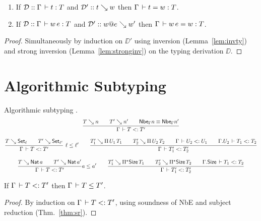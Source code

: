 \documentclass[acmlarge,review,anonymous]{acmart}\settopmatter{printfolios=true}
\begin{document}
\begin{theorem}
  \label{thm:sr}
  \bla
  \begin{enumerate}
  \item
  If\/ $\mathcal{D} :: \Gamma \,\vdash t : T$ and $\mathcal{D}' :: t \searrow w$ then $\Gamma \,\vdash t = w : T$.
  \item
  If\/ $\mathcal{D} :: \Gamma \,\vdash w\, e : T$ and $\mathcal{D}' :: w @ e \searrow w'$ then $\Gamma \,\vdash w\,e = w : T$.
  \end{enumerate}
\end{theorem}
\begin{proof}
  Simultaneously by induction on $\DD'$
  using inversion (Lemma~\ref{lem:invty}) and strong inversion (Lemma~\ref{lem:stronginv})
  on the typing derivation $\DD$. %
\end{proof}

\section{Algorithmic Subtyping}
\label{sec:asub}

Algorithmic subtyping .
\begin{gather*}
  \ru{T \evalsto n \qquad
      T' \evalsto n' \qquad
      \Nbe \Gamma n \equiv \Nbe \Gamma n'
    }{\Gamma \der T \asub T'}
\\[2ex]
  \rux{T \evalsto \Set[\ell] \qquad
      T' \evalsto \Set[\ell']
    }{\Gamma \der T \asub T'
    }{\ell \leq \ell'}
\qquad
  \ru{T_1' \evalsto \piT{U_1}{T_1} \qquad
      T_2' \evalsto \piT{U_2}{T_2} \qquad
      \Gamma \der U_2 \asub U_1 \qquad
      \cext \Gamma {U_2} \der T_1 \asub T_2
    }{\Gamma \der T_1' \asub T_2'}
\\[2ex]
  \ru{T \evalsto \Nat a \qquad
      T' \evalsto \Nat a'
    }{\Gamma \der T \asub T'
    }{a \leq a'}
\qquad
  \ru{T_1' \evalsto \epiT\Size{T_1} \qquad
      T_2' \evalsto \epiT\Size{T_2} \qquad
      \cext \Gamma {\Size} \der T_1 \asub T_2
    }{\Gamma \der T_1' \asub T_2'}
\end{gather*}

\begin{lemma}
  \label{lem:asubsound}
  If\/ $\Gamma \,\vdash T \mathrel{{<}{:}} T'$ then $\Gamma \,\vdash T \leq T'$.
\end{lemma}
\begin{proof}
  By induction on $\Gamma \,\vdash T \mathrel{{<}{:}} T'$, using soundness of NbE and subject reduction (Thm.~\ref{thm:sr}).
\end{proof}
\end{document}
